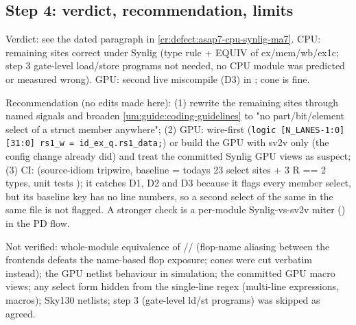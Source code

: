 \subsection{Step 4: verdict, recommendation, limits}\label{cr:defect:synlig-struct-select-ainf:step-4-verdict-recommendation-limits}

\begin{record}

Verdict: see the dated paragraph in \cref{cr:defect:asap7-cpu-synlig-ma7}.
CPU: remaining sites correct under Synlig (type rule + EQUIV of
ex/\allowbreak{}mem/\allowbreak{}wb/\allowbreak{}ex1c; step 3 gate-level
load/\allowbreak{}store programs not needed, no CPU module was predicted
or measured wrong). GPU: second live miscompile (D3) in
;  cone is fine.

Recommendation (no  edits made here): (1) rewrite the
remaining sites through named signals and broaden
\cref{um:guide:coding-guidelines} to "no
part/\allowbreak{}bit/\allowbreak{}element select of a struct member
anywhere"; (2) GPU: wire-first
(\texttt{logic\ [N\_\allowbreak{}LANES-\allowbreak{}1:\allowbreak{}0][31:\allowbreak{}0]\ rs1\_\allowbreak{}w\ =\allowbreak{}\ id\_\allowbreak{}ex\_\allowbreak{}q.\allowbreak{}rs1\_\allowbreak{}data;})
or build the GPU with sv2v only (the  config change already
did) and treat the committed Synlig GPU views as suspect; (3) CI:
 (source-idiom tripwire,
baseline  =
today\textquotesingle s 23 select sites + 3 R == 2 types, unit tests
); it catches D1, D2
and D3 because it flags every member select, but its baseline key has no
line numbers, so a second select of the same  in the
same file is not flagged. A stronger check is a per-module
Synlig-vs-sv2v miter () in the PD flow.

Not verified: whole-module equivalence of
// (flop-name
aliasing between the frontends defeats the name-based flop exposure;
cones were cut verbatim instead); the GPU netlist behaviour in
simulation; the committed GPU macro views; any select form hidden from
the single-line regex (multi-line expressions, macros); Sky130 netlists;
step 3 (gate-level ld/st programs) was skipped as agreed.

\end{record}

